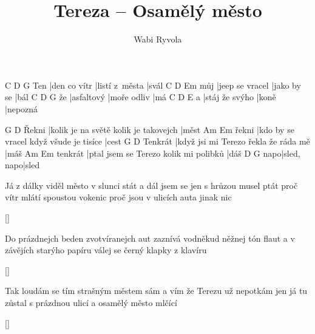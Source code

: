 \documentclass{song}
\title{Tereza -- Osamělý město}
\author{Wabi Ryvola}
\begin{document}
\strophe
    C            D              G
Ten |den co vítr |listí z~města |svál
    C               D           Em
můj |jeep se vracel |jako by se |bál
   C          D           G
že |asfaltový |moře odliv |má
  C              D     E
a |stáj že svýho |koně |nepozná
\endstrophe

      G                                     D
Řekni |kolik je na světě kolik je takovejch |měst
      Am                                     Em
řekni |kdo by se vracel když všude je tisíce |cest
        G                                    D
Tenkrát |když jsi mi Terezo řekla že ráda mě |máš
        Am                                    Em
tenkrát |ptal jsem se Terezo kolik mi polibků |dáš
    D          G
napo|sled, napo|sled
\endstrophe

\strophe*
Já z dálky viděl město v slunci stát
a dál jsem se jen s hrůzou musel ptát
proč vítr mlátí spoustou vokenic
proč jsou v ulicích auta jinak nic
\endstrophe

\ref{}

\strophe*
Do prázdnejch beden zvotvíranejch aut
zaznívá vodněkud něžnej tón flaut
a v závějích starýho papíru
válej se černý klapky z klavíru
\endstrophe

\ref{}

\strophe*
Tak loudám se tím strašným městem sám
a vím že Terezu už nepotkám
jen já tu zůstal s prázdnou ulicí
a osamělý město mlčící
\endstrophe

\ref{}
\end{document}
